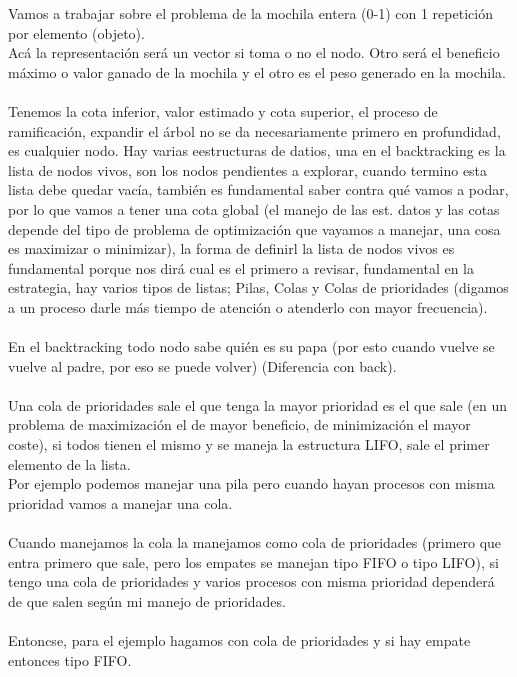\documentclass[tikz,11pt,fleqn]{book} %
\begin{document}
\begin{example}
    Vamos a trabajar sobre el problema de la mochila entera (0-1) con 1 repetición por elemento (objeto).
    ~\\
    Acá la representación será un vector si toma o no el nodo. Otro será el beneficio máximo o valor ganado de la mochila y el otro es el peso generado en la mochila.
    ~\\
    Tenemos la cota inferior, valor estimado y cota superior, el proceso de ramificación, expandir el árbol no se da necesariamente primero en profundidad, es cualquier nodo. Hay varias eestructuras de datios, una en el backtracking es la lista de nodos vivos, son los nodos pendientes a explorar, cuando termino esta lista debe quedar vacía, también es fundamental saber contra qué vamos a podar, por lo que vamos a tener una cota global (el manejo de las est. datos y las cotas depende del tipo de problema de optimización que vayamos a manejar, una cosa es maximizar o minimizar), la forma de definirl la lista de nodos vivos es fundamental porque nos dirá cual es el primero a revisar, fundamental en la estrategia, hay varios tipos de listas; Pilas, Colas y Colas de prioridades (digamos a un proceso darle más tiempo de atención o atenderlo con mayor frecuencia).
    \\~\\
    En el backtracking todo nodo sabe quién es su papa (por esto  cuando vuelve se vuelve al padre, por eso se puede volver) (Diferencia con back). 
    \\~\\
    Una cola de prioridades sale el que tenga la mayor prioridad es el que sale (en un problema de maximización el de mayor beneficio, de minimización el mayor coste), si todos tienen el mismo y se maneja la estructura LIFO, sale el primer elemento de la lista.
    ~\\
        Por ejemplo podemos manejar una pila pero cuando hayan procesos con misma prioridad vamos a manejar una cola.
    \\~\\
    Cuando manejamos la cola la manejamos como cola de prioridades (primero que entra primero que sale, pero los empates se manejan tipo FIFO o tipo LIFO), si tengo una cola de prioridades y varios procesos con misma prioridad dependerá de que salen según mi manejo de prioridades.
    \\~\\
    Entoncse, para el ejemplo hagamos con cola de prioridades y si hay empate entonces tipo FIFO.


\end{example}
\end{document}
